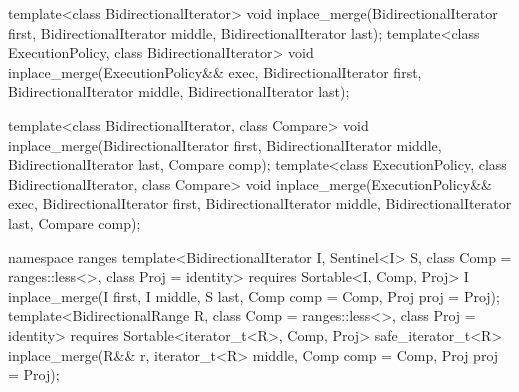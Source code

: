%
\begin{itemdecl}
template<class BidirectionalIterator>
  void inplace_merge(BidirectionalIterator first,
                     BidirectionalIterator middle,
                     BidirectionalIterator last);
template<class ExecutionPolicy, class BidirectionalIterator>
  void inplace_merge(ExecutionPolicy&& exec,
                     BidirectionalIterator first,
                     BidirectionalIterator middle,
                     BidirectionalIterator last);

template<class BidirectionalIterator, class Compare>
  void inplace_merge(BidirectionalIterator first,
                     BidirectionalIterator middle,
                     BidirectionalIterator last, Compare comp);
template<class ExecutionPolicy, class BidirectionalIterator, class Compare>
  void inplace_merge(ExecutionPolicy&& exec,
                     BidirectionalIterator first,
                     BidirectionalIterator middle,
                     BidirectionalIterator last, Compare comp);
\end{itemdecl}
\begin{addedblock}
\begin{itemdecl}
namespace ranges {
  template<BidirectionalIterator I, Sentinel<I> S, class Comp = ranges::less<>,
      class Proj = identity>
    requires Sortable<I, Comp, Proj>
    I inplace_merge(I first, I middle, S last, Comp comp = Comp{}, Proj proj = Proj{});
  template<BidirectionalRange R, class Comp = ranges::less<>, class Proj = identity>
    requires Sortable<iterator_t<R>, Comp, Proj>
    safe_iterator_t<R>
      inplace_merge(R&& r, iterator_t<R> middle, Comp comp = Comp{},
                    Proj proj = Proj{});
}
\end{itemdecl}
\end{addedblock}

